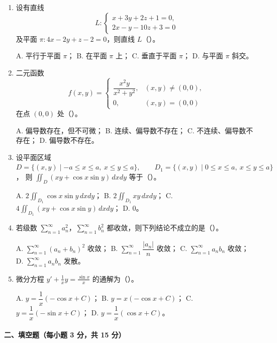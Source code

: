 \begin{enumerate}
  \item 设有直线
  \[
    L:\begin{cases}
      x+3y+2z+1=0,\\
      2x-y-10z+3=0
    \end{cases}
  \]
  及平面 $\pi:4x-2y+z-2=0$，则直线 $L$（\quad）。

  A. 平行于平面 $\pi$；\quad
  B. 在平面 $\pi$ 上；\quad
  C. 垂直于平面 $\pi$；\quad
  D. 与平面 $\pi$ 斜交。

  \item 二元函数
  \[
    f(x,y)=
    \begin{cases}
      \dfrac{x^2y}{x^2+y^2}, & (x,y)\ne(0,0),\\
      0, & (x,y)=(0,0)
    \end{cases}
  \]
  在点 $(0,0)$ 处（\quad）。

  A. 偏导数存在，但不可微；\quad
  B. 连续、偏导数不存在；\quad
  C. 不连续、偏导数不存在；\quad
  D. 偏导数不存在。

  \item 设平面区域 \(\displaystyle D=\{(x,y)\mid -a\le x\le a,\ x\le y\le a\},\qquad
    D_1=\{(x,y)\mid 0\le x\le a,\ x\le y\le a\}\)，
  则
  \(\displaystyle \iint_D (xy+\cos x\sin y)\,dxdy\)
  等于（\quad）。

  A. $2\iint_{D_1}\cos x\sin y\,dxdy$；\quad
  B. $2\iint_{D_1}xy\,dxdy$；\quad
  C. $4\iint_{D_1}(xy+\cos x\sin y)\,dxdy$；\quad
  D. $0$。

  \item 若级数 $\sum_{n=1}^{\infty}a_n^2$，$\sum_{n=1}^{\infty}b_n^2$ 都收敛，则下列结论不成立的是（\quad）。

  A. $\sum_{n=1}^{\infty}(a_n+b_n)^2$ 收敛；\quad
  B. $\sum_{n=1}^{\infty}\dfrac{|a_n|}{n}$ 收敛；\quad
  C. $\sum_{n=1}^{\infty}a_nb_n$ 收敛；\quad
  D. $\sum_{n=1}^{\infty}a_nb_n$ 发散。

  \item 微分方程 \(\displaystyle y'+\frac{1}{x}y=\frac{\sin x}{x}\)
  的通解为（\quad）。

  A. $y=\dfrac{1}{x}(-\cos x+C)$；\quad
  B. $y=x(-\cos x+C)$；\quad
  C. $y=\dfrac{1}{x}(-\sin x+C)$；\quad
  D. $y=\dfrac{1}{x}(\cos x+C)$。
\end{enumerate}

\paragraph*{二、填空题（每小题 3 分，共 15 分）}

